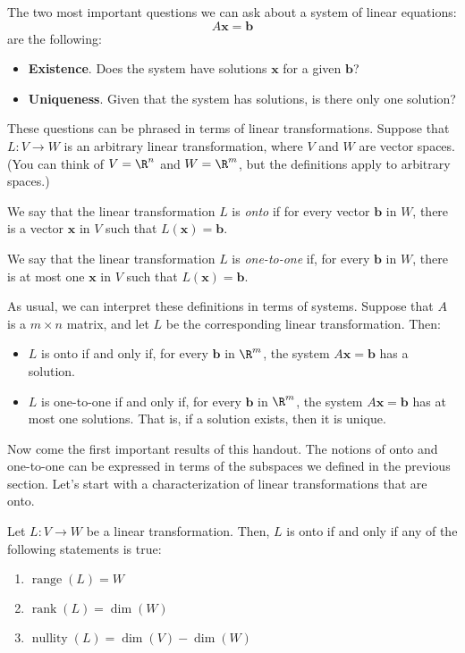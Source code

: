 \documentclass[12pt]{article}
\DeclareMathOperator{\range}{range}
\DeclareMathOperator{\rank}{rank}
\DeclareMathOperator{\nullity}{nullity}
\begin{document}
The two most important questions we can ask about a system of linear equations:
\[
A\mathbf{x}=\mathbf{b}
\]
are the following:
\begin{itemize}
\item \textbf{Existence}. Does the system have solutions $\mathbf{x}$ for a given $\mathbf{b}$?
\item \textbf{Uniqueness}. Given that the system has solutions, is there only one solution?
\end{itemize}

These questions can be phrased in terms of linear transformations. Suppose that $L:V\to W$ is an arbitrary linear transformation, where $V$ and $W$ are vector spaces. (You can think of $V=\R^n$ and $W=\R^m$, but the definitions apply to arbitrary spaces.)

\begin{definition} We say that the linear transformation $L$ is \emph{onto} if for every vector $\mathbf{b}$ in $W$, there is a vector $\mathbf{x}$ in $V$ such that $L(\mathbf{x})=\mathbf{b}$. \end{definition}

\begin{definition} We say that the linear transformation $L$ is \emph{one-to-one} if, for every $\mathbf{b}$ in $W$, there is at most one $\mathbf{x}$ in $V$ such that $L(\mathbf{x})=\mathbf{b}$.
\end{definition}

As usual, we can interpret these definitions in terms of systems. Suppose that $A$ is a $m\times n$ matrix, and let $L$ be the corresponding linear transformation. Then:

\begin{itemize}
\item $L$ is onto if and only if, for every $\mathbf{b}$ in $\R^m$, the system $A\mathbf{x}=\mathbf{b}$ has a solution.
\item $L$ is one-to-one if and only if, for every $\mathbf{b}$ in $\R^m$, the system $A\mathbf{x}=\mathbf{b}$ has at most one solutions. That is, if a solution exists, then it is unique.
\end{itemize}

Now come the first important results of this handout. The notions of onto and one-to-one can be expressed in terms of the subspaces we defined in the previous section. Let's start with a characterization of linear transformations that are onto.

\begin{theorem} 
\label{characterization-onto}
Let $L:V\to W$ be a linear transformation. Then, $L$ is onto if and only if any of the following statements is true:
\begin{enumerate}
\item $\range(L)=W$
\item $\rank(L)=\dim(W)$
\item $\nullity(L)=\dim(V)-\dim(W)$
\end{enumerate}
\end{theorem}
\end{document}
